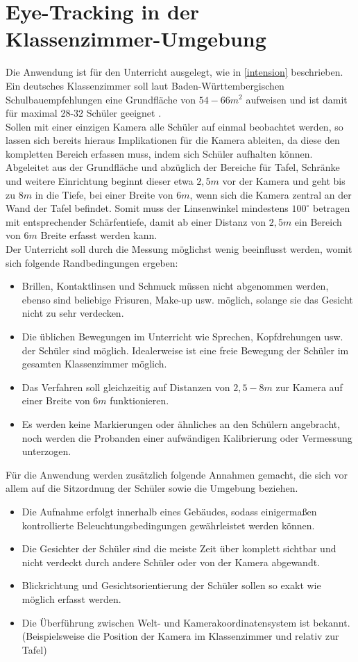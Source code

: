 \section{Eye-Tracking in der Klassenzimmer-Umgebung}
Die Anwendung ist für den Unterricht ausgelegt, wie in \autoref{intension} beschrieben. Ein deutsches Klassenzimmer soll laut Baden-Württembergischen Schulbauempfehlungen eine Grundfläche von $54-66m^2$ aufweisen und ist damit für maximal 28-32 Schüler geeignet \cite{bauordung}.\\
Sollen mit einer einzigen Kamera alle Schüler auf einmal beobachtet werden, so lassen sich bereits hieraus Implikationen für die Kamera ableiten, da diese den kompletten Bereich erfassen muss, indem sich Schüler aufhalten können. Abgeleitet aus der Grundfläche und abzüglich der Bereiche für Tafel, Schränke und weitere Einrichtung beginnt dieser etwa $2,5m$ vor der Kamera und geht bis zu $8m$ in die Tiefe, bei einer Breite von $6m$, wenn sich die Kamera zentral an der Wand der Tafel befindet. Somit muss der Linsenwinkel mindestens $100^\circ$ betragen mit entsprechender Schärfentiefe, damit ab einer Distanz von $2,5m$ ein Bereich von $6m$ Breite erfasst werden kann.\\
Der Unterricht soll durch die Messung möglichst wenig beeinflusst werden, womit sich folgende Randbedingungen ergeben:
\begin{itemize}
\item Brillen, Kontaktlinsen und Schmuck müssen nicht abgenommen werden, ebenso sind beliebige Frisuren, Make-up usw. möglich, solange sie das Gesicht nicht zu sehr verdecken.
\item Die üblichen Bewegungen im Unterricht wie Sprechen, Kopfdrehungen usw. der Schüler sind möglich. Idealerweise ist eine freie Bewegung der Schüler im gesamten Klassenzimmer möglich.
\item Das Verfahren soll gleichzeitig auf Distanzen von $2,5 - 8m$ zur Kamera auf einer Breite von $6m$ funktionieren.
\item Es werden keine Markierungen oder ähnliches an den Schülern angebracht, noch werden die Probanden einer aufwändigen Kalibrierung oder Vermessung unterzogen.
\end{itemize}
Für die Anwendung werden zusätzlich folgende Annahmen gemacht, die sich vor allem auf die Sitzordnung der Schüler sowie die Umgebung beziehen.
\begin{itemize}
\item Die Aufnahme erfolgt innerhalb eines Gebäudes, sodass einigermaßen kontrollierte Beleuchtungsbedingungen gewährleistet werden können.
\item Die Gesichter der Schüler sind die meiste Zeit über komplett sichtbar und nicht verdeckt durch andere Schüler oder von der Kamera abgewandt.
\item Blickrichtung und Gesichtsorientierung der Schüler sollen so exakt wie möglich erfasst werden.
\item Die Überführung zwischen Welt- und Kamerakoordinatensystem ist bekannt.\\
(Beispielsweise die Position der Kamera im Klassenzimmer und relativ zur Tafel)
\end{itemize}